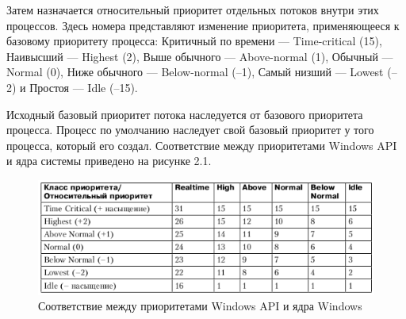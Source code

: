 Затем назначается относительный приоритет отдельных потоков внутри этих процессов.
Здесь номера представляют изменение приоритета, применяющееся к базовому приоритету
процесса: Критичный по времени — Time-critical (15), Наивысший — Highest (2), Выше обычного — Above-normal (1), Обычный — Normal (0), Ниже обычного — Below-normal (–1), Самый низший — Lowest (–2) и Простоя — Idle (–15).

Исходный базовый приоритет потока наследуется от базового приоритета процесса. Процесс по умолчанию наследует свой базовый приоритет у того процесса, который его создал.
Соответствие между приоритетами Windows API и ядра системы приведено на рисунке 2.1.
\begin{figure}[H]
	\begin{center}
		\includegraphics[scale=0.6]{assets/win_pr.png}
	\end{center}
	\caption{Соответствие между приоритетами Windows API и ядра Windows}
\end{figure}

